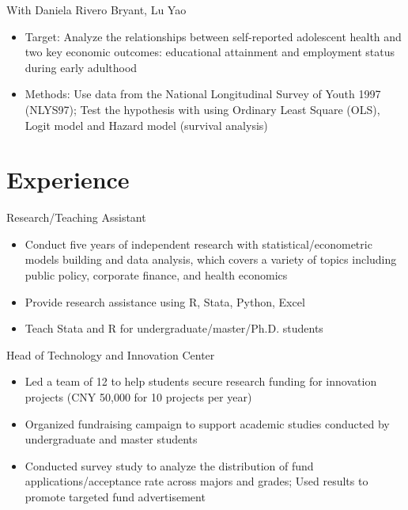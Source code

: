 \documentclass{resume}
\begin{document}
With Daniela Rivero Bryant, Lu Yao
\begin{itemize}
  \item Target: Analyze the relationships between self-reported adolescent health and two key economic outcomes: educational attainment and employment status during early adulthood
  \item Methods: Use data from the National Longitudinal Survey of Youth 1997 (NLYS97); Test the hypothesis with using Ordinary Least Square (OLS), Logit model and Hazard model (survival analysis) 
  \end{itemize}

\section{Experience}
Research/Teaching Assistant
\begin{itemize}
  \item Conduct five years of independent research with statistical/econometric models building and data analysis, which covers a variety of topics including public policy, corporate finance, and health economics
  \item Provide research assistance using R, Stata, Python, Excel
  \item Teach Stata and R for undergraduate/master/Ph.D. students
\end{itemize}


Head of Technology and Innovation Center
\begin{itemize}
  \item Led a team of 12 to help students secure research funding for innovation projects (CNY 50,000 for 10 projects per year)
  \item Organized fundraising campaign to support academic studies conducted by undergraduate and master students
  \item Conducted survey study to analyze the distribution of fund applications/acceptance rate across majors and grades; Used results to promote targeted fund advertisement
\end{itemize}
\end{document}
